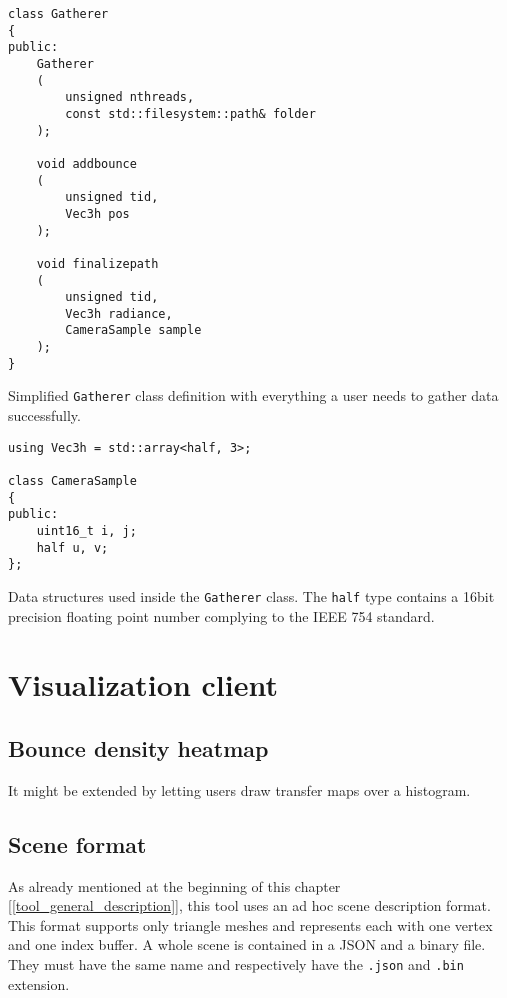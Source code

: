 \begin{Listing}
	\begin{lstlisting}
class Gatherer
{
public:
	Gatherer
	(
		unsigned nthreads, 
		const std::filesystem::path& folder
	);

	void addbounce
	(
		unsigned tid, 
		Vec3h pos
	);

	void finalizepath
	(
		unsigned tid, 
		Vec3h radiance, 
		CameraSample sample
	);
}
	\end{lstlisting}
	\caption{Simplified \texttt{Gatherer} class definition with everything a user needs to gather data successfully.}
	\label{gatherer_signatures}
\end{Listing}

\begin{Listing}
	\begin{lstlisting}
using Vec3h = std::array<half, 3>;

class CameraSample
{
public:
	uint16_t i, j;
	half u, v;
};
	\end{lstlisting}
	\caption{Data structures used inside the \texttt{Gatherer} class. The \texttt{half} type contains a 16bit precision floating point number complying to the IEEE 754 standard.}
	\label{gatherer_datastructures}
\end{Listing}


\section{Visualization client}

\subsection{Bounce density heatmap}
It might be extended by letting users draw transfer maps over a histogram.

\subsection{Scene format}
\label{scene_format}

As already mentioned at the beginning of this chapter [\ref{tool_general_description}], this tool uses an ad hoc scene description format. This format supports only triangle meshes and represents each with one vertex and one index buffer. A whole scene is contained in a JSON\cite{rfc8259} and a binary file. They must have the same name and respectively have the \texttt{.json} and \texttt{.bin} extension. 

